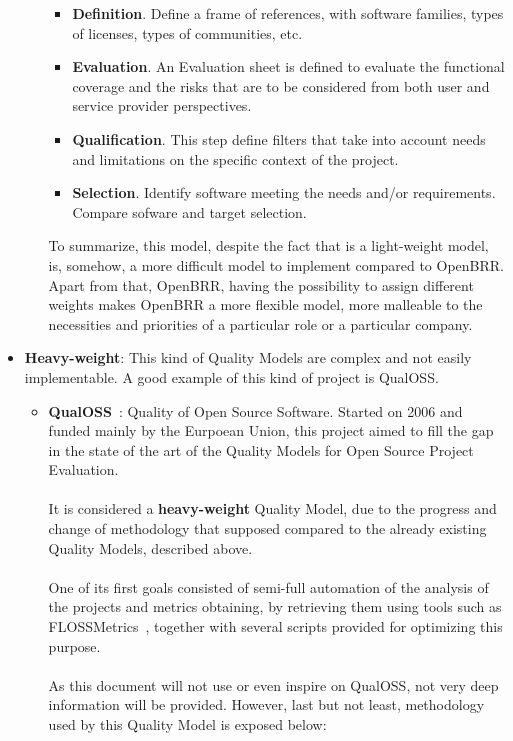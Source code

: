 \documentclass[11pt]{article}
\begin{document}
\begin{itemize}
\begin{itemize}
\begin{itemize}\itemsep0pt
\item{\textbf{Definition}}. Define a frame of references, with software families, types of licenses, types of communities, etc.
\item{\textbf{Evaluation}}. An Evaluation sheet is defined to evaluate the functional coverage and the risks that are to be considered from both user and service provider perspectives.
\item{\textbf{Qualification}}. This step define filters that take into account needs and limitations on the 
specific context of the project.
\item{\textbf{Selection}}. Identify software meeting the needs and/or requirements. Compare sofware and target selection.
\end{itemize}
To summarize, this model, despite the fact that is a light-weight model, is, somehow, a more difficult model to implement compared to OpenBRR. Apart from that, OpenBRR, having the possibility to assign different weights makes OpenBRR a more flexible model, more malleable to the necessities and priorities of a particular role or a particular company.
\end{itemize}
\item{\textbf{Heavy-weight}}: This kind of Quality Models are complex and not easily implementable. A good example of this kind of project is QualOSS.
\begin{itemize}\itemsep0pt
\item{\textbf{QualOSS}}~\cite{QUALOSS00}: Quality of Open Source Software. Started on 2006 and funded mainly by the Eurpoean Union, this project aimed to fill the gap in the state of the art of the Quality Models for Open Source Project Evaluation.\\
\\
It is considered a \textbf{heavy-weight} Quality Model, due to the progress and change of methodology that supposed compared to the already existing Quality Models, described above.\\
\\
One of its first goals consisted of semi-full automation of the analysis of the projects and metrics obtaining, by retrieving them using tools such as FLOSSMetrics~\cite{FLOSSM00}, together with several scripts provided for optimizing this purpose.\\
\\
As this document will not use or even inspire on QualOSS, not very deep information will be provided. However, last but not least, methodology used by this Quality Model is exposed below:

\end{itemize}
\end{itemize}
\end{document}
